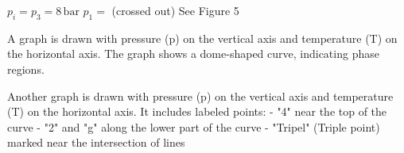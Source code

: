 \( p_i = p_3 = 8 \, \text{bar} \)  
\( p_1 = \) (crossed out)  
See Figure 5  

A graph is drawn with pressure (p) on the vertical axis and temperature (T) on the horizontal axis. The graph shows a dome-shaped curve, indicating phase regions.  

Another graph is drawn with pressure (p) on the vertical axis and temperature (T) on the horizontal axis. It includes labeled points:  
- "4" near the top of the curve  
- "2" and "g" along the lower part of the curve  
- "Tripel" (Triple point) marked near the intersection of lines